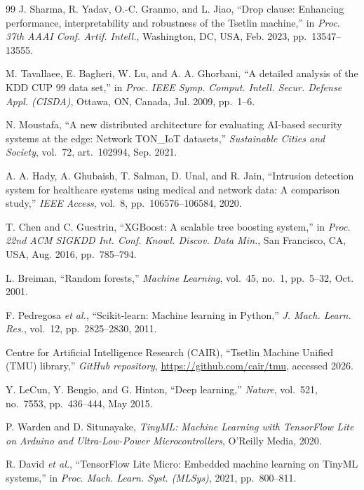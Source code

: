 \documentclass[journal,10pt]{IEEEtran}
\begin{document}
\begin{thebibliography}{99}
J. Sharma, R. Yadav, O.-C. Granmo, and L. Jiao,
``Drop clause: Enhancing performance, interpretability and robustness
of the Tsetlin machine,''
in \emph{Proc. 37th AAAI Conf. Artif. Intell.}, Washington, DC, USA,
Feb. 2023, pp.~13547--13555.

M. Tavallaee, E. Bagheri, W. Lu, and A. A. Ghorbani,
``A detailed analysis of the KDD CUP 99 data set,''
in \emph{Proc. IEEE Symp. Comput. Intell. Secur. Defense Appl. (CISDA)},
Ottawa, ON, Canada, Jul. 2009, pp.~1--6.

N. Moustafa,
``A new distributed architecture for evaluating AI-based security
systems at the edge: Network TON\_IoT datasets,''
\emph{Sustainable Cities and Society}, vol.~72, art.~102994, Sep. 2021.

A. A. Hady, A. Ghubaish, T. Salman, D. Unal, and R. Jain,
``Intrusion detection system for healthcare systems using medical and
network data: A comparison study,''
\emph{IEEE Access}, vol.~8, pp.~106576--106584, 2020.

T. Chen and C. Guestrin,
``XGBoost: A scalable tree boosting system,''
in \emph{Proc. 22nd ACM SIGKDD Int. Conf. Knowl. Discov. Data Min.},
San Francisco, CA, USA, Aug. 2016, pp.~785--794.

L. Breiman,
``Random forests,''
\emph{Machine Learning}, vol.~45, no.~1, pp.~5--32, Oct. 2001.

F. Pedregosa \emph{et al.},
``Scikit-learn: Machine learning in Python,''
\emph{J. Mach. Learn. Res.}, vol.~12, pp.~2825--2830, 2011.

Centre for Artificial Intelligence Research (CAIR),
``Tsetlin Machine Unified (TMU) library,''
\emph{GitHub repository}, \url{https://github.com/cair/tmu},
accessed 2026.

Y. LeCun, Y. Bengio, and G. Hinton,
``Deep learning,''
\emph{Nature}, vol.~521, no.~7553, pp.~436--444, May 2015.

P. Warden and D. Situnayake,
\emph{TinyML: Machine Learning with TensorFlow Lite on Arduino and
Ultra-Low-Power Microcontrollers},
O'Reilly Media, 2020.

R. David \emph{et al.},
``TensorFlow Lite Micro: Embedded machine learning on TinyML systems,''
in \emph{Proc. Mach. Learn. Syst. (MLSys)}, 2021, pp.~800--811.


\end{thebibliography}
\end{document}
